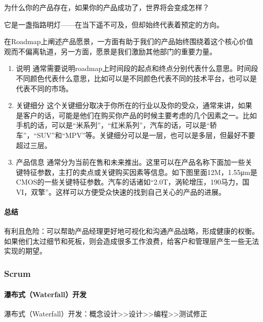 \documentclass[letterpaper,11pt,english]{sphinxmanual}
\begin{document}
为什么你的产品存在，如果你的产品成功了，世界将会变成怎样？

它是一盏指路明灯——在当下遥不可及，但却始终代表着预定的方向。

在Roadmap上阐述产品愿景，一方面有助于我们的产品始终围绕着这个核心价值观而不偏离轨道，另一方面，愿景是我们激励其他部门的重要力量。
\begin{enumerate}
%
\setcounter{enumi}{1}
\item {} 
说明
通常需要说明roadmap上时间段的起点和终点分别代表什么意思。时间段不同颜色代表什么意思，比如可以是不同颜色代表不同的技术平台，也可以是代表不同的市场。

\item {} 
关键细分
这个关键细分取决于你所在的行业以及你的受众，通常来讲，如果是客户的话，可能是他们在购买你产品的时候主要考虑的几个因素之一。比如手机的话，可以是“米系列”，“红米系列”，汽车的话，可以是“轿车”，“SUV”和“MPV”等。关键细分可以是一层，也可以是多层，但最好不要超过三层。

\item {} 
产品信息
通常分为当前在售和未来推出。这里可以在产品名称下面加一些关键特征参数，主打的卖点或关键购买因素等信息。如下图里面12M，1.55μm是CMOS的一些关键特征参数。汽车的话诸如“2.0T，涡轮增压，190马力，国VI，双擎”。这样可以方便受众快速的找到自己关心的产品的进展。

\end{enumerate}


\paragraph{总结}
\label{\detokenize{chapter_project/Roadmap:id5}}
有利且危险：可以帮助产品经理更好地可视化和沟通产品战略，形成健康的权衡。如果他们太过细节和死板，则会造成很多工作浪费，给客户和管理层产生一些无法实现的期望。


\subsubsection{Scrum}
\label{\detokenize{chapter_project/Scrum:scrum}}\label{\detokenize{chapter_project/Scrum::doc}}

\paragraph{瀑布式（Waterfall）开发}
\label{\detokenize{chapter_project/Scrum:waterfall}}
瀑布式（Waterfall）开发：概念设计>>设计>>编程>>测试修正
%
\begin{footnote}[735]\sphinxAtStartFootnote
{}
%
\end{footnote}
\end{document}
